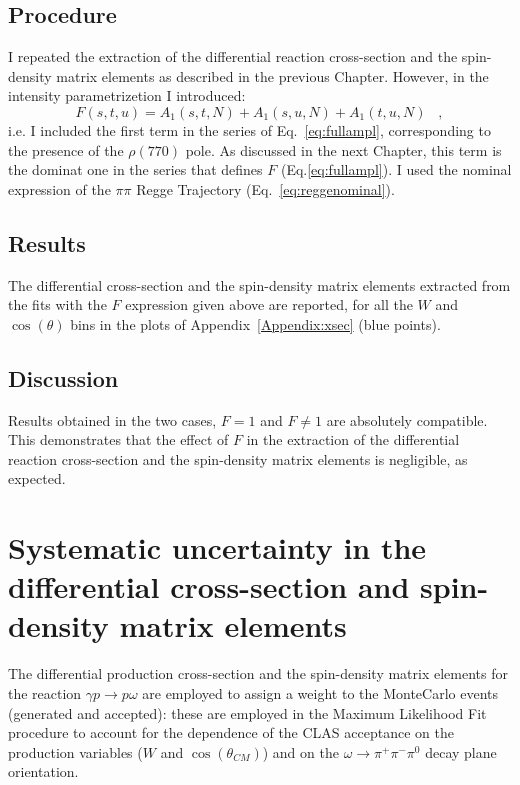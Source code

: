 \documentclass[a4paper,10pt]{report}
\newcommand{\decay}{$\omega \rightarrow \pi^+ \pi^- \pi^0$ }
\newcommand{\production}{$\gamma p \rightarrow p \omega$ }
\begin{document}
\subsection{Procedure}

I repeated the extraction of the differential reaction cross-section and the spin-density matrix elements as described in the previous Chapter.
However, in the intensity parametrizetion I introduced:
\begin{equation}
F(s,t,u)=A_1(s,t,N)+A_1(s,u,N)+A_1(t,u,N) \; \; \; ,
\end{equation}
i.e. I included the first term in the series of Eq.~\ref{eq:fullampl}, corresponding to the presence of the $\rho(770)$ pole. As discussed in the next Chapter, this term is the dominat one in the series that defines $F$ (Eq.\ref{eq:fullampl}).
I used the nominal expression of the $\pi \pi$ Regge Trajectory (Eq.~\ref{eq:reggenominal}).

\subsection{Results}

The differential cross-section and the spin-density matrix elements extracted from the fits with the $F$ expression given above are reported, for all the $W$ and $\cos(\theta)$ bins in the plots of Appendix~\ref{Appendix:xsec} (blue points).

\subsection{Discussion}

Results obtained in the two cases, $F=1$ and $F\neq 1$ are absolutely compatible. This demonstrates that the effect of $F$ in the extraction of the differential reaction cross-section and the spin-density matrix elements is negligible, as expected.



\section{Systematic uncertainty in the differential cross-section and spin-density matrix elements}

The differential production cross-section and the spin-density matrix elements for the reaction \production are employed to assign a weight to the MonteCarlo events (generated and accepted): these are employed in the Maximum Likelihood Fit procedure to account
for the dependence of the CLAS acceptance on the production variables ($W$ and $\cos(\theta_{CM})$) and on the \decay decay plane orientation. 
\end{document}
